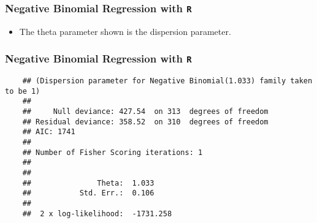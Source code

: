 \documentclass[MASTER.tex]{subfiles}
\begin{document}
\begin{frame}[fragile]
	\frametitle{Negative Binomial Regression with \texttt{R} }
	\Large
\begin{itemize}
	\item The theta parameter shown is the dispersion parameter. 
\end{itemize}
\end{frame}

\begin{frame}[fragile]
	\frametitle{Negative Binomial Regression with \texttt{R} }
	
	\begin{verbatim}
	## (Dispersion parameter for Negative Binomial(1.033) family taken to be 1)
	## 
	##     Null deviance: 427.54  on 313  degrees of freedom
	## Residual deviance: 358.52  on 310  degrees of freedom
	## AIC: 1741
	## 
	## Number of Fisher Scoring iterations: 1
	## 
	## 
	##               Theta:  1.033 
	##           Std. Err.:  0.106 
	## 
	##  2 x log-likelihood:  -1731.258
	\end{verbatim}
	
\end{frame}
\end{document}
